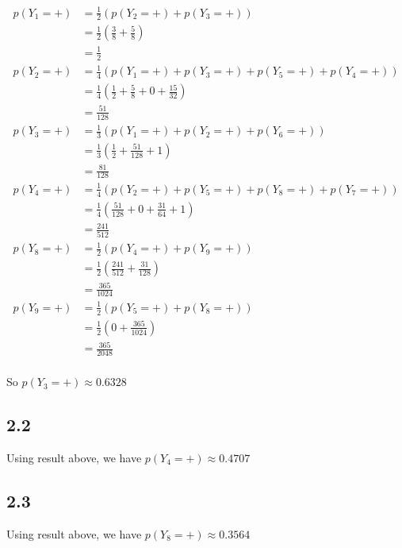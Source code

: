 \documentclass{book}
\begin{document}
    \begin{align*}
        p(Y_1 = +) 
        & = \frac{1}{2}\left( p(Y_2 = +) + p(Y_3 = +) \right)\\
        & = \frac{1}{2}\left( \frac{3}{8} + \frac{5}{8} \right)\\
        & = \frac{1}{2}\\
        p(Y_2 = +) 
        & = \frac{1}{4}\left( p(Y_1 = +) + p(Y_3 = +) + p(Y_5 = +) + p(Y_4 = +) \right)\\
        & = \frac{1}{4}\left( \frac{1}{2} + \frac{5}{8} + 0 + \frac{15}{32} \right)\\
        & = \frac{51}{128} \\
        p(Y_3 = +) 
        & = \frac{1}{3}\left( p(Y_1 = +) + p(Y_2 = +) + p(Y_6 = +)  \right)\\
        & = \frac{1}{3}\left( \frac{1}{2} + \frac{51}{128}  + 1\right)\\
        & = \frac{81}{128} \\
        p(Y_4 = +) 
        & = \frac{1}{4}\left( p(Y_2 = +) + p(Y_5 = +) + p(Y_8 = +) + p(Y_7 = +)  \right)\\
        & = \frac{1}{4}\left( \frac{51}{128} + 0  + \frac{31}{64} + 1 \right)\\
        & = \frac{241}{512} \\
        p(Y_8 = +) 
        & = \frac{1}{2}\left( p(Y_4 = +) + p(Y_9 = +)   \right)\\
        & = \frac{1}{2}\left( \frac{241}{512} + \frac{31}{128} \right)\\
        & = \frac{365}{1024} \\
        p(Y_9 = +) 
        & = \frac{1}{2}\left( p(Y_5 = +) + p(Y_8 = +)   \right)\\
        & = \frac{1}{2}\left( 0 + \frac{365}{1024} \right)\\
        & = \frac{365}{2048} \\
    \end{align*}
    

So $p(Y_3 = + ) \approx 0.6328 $    

\subsection*{2.2}
Using result above, we have $p(Y_4 = + ) \approx 0.4707 $    

\subsection*{2.3}
Using result above, we have $p(Y_8 = + ) \approx 0.3564 $    
\end{document}
